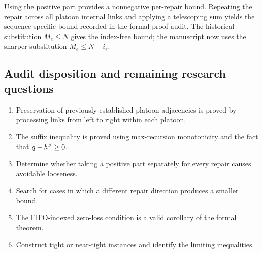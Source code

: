 Using the positive part provides a nonnegative per-repair bound. Repeating the repair across all platoon internal links and applying a telescoping sum yields the sequence-specific bound recorded in the formal proof audit. The historical substitution \(M_e\le N\) gives the index-free bound; the manuscript now uses the sharper substitution \(M_e\le N-i_e\).

\subsection*{Audit disposition and remaining research questions}

\begin{enumerate}
  \item Preservation of previously established platoon adjacencies is proved by processing links from left to right within each platoon.
  \item The suffix inequality is proved using max-recursion monotonicity and the fact that \(q-h^{\mathrm{F}}\ge0\).
  \item Determine whether taking a positive part separately for every repair causes avoidable looseness.
  \item Search for cases in which a different repair direction produces a smaller bound.
  \item The FIFO-indexed zero-loss condition is a valid corollary of the formal theorem.
  \item Construct tight or near-tight instances and identify the limiting inequalities.
\end{enumerate}
